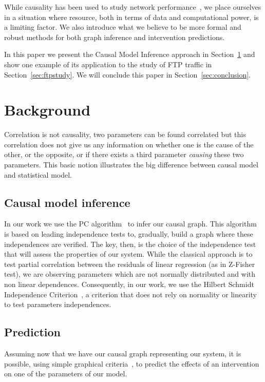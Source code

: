 \documentclass[]{algotel}
\begin{document}
While causality has been used to study network performance~\cite{Tariq:2008:AWD:1402946.1402971}, we place ourselves in a situation where resource, both in terms of data and computational power, is a limiting factor. We also introduce what we believe to be more formal and robust methods for both graph inference and intervention predictions.

In this paper we present the Causal Model Inference approach in Section~\ref{sec:introductioncausality} and show one example of its application to the study of FTP traffic in Section~\ref{sec:ftpstudy}. We will conclude this paper in Section~\ref{sec:conclusion}.

\section{Background}
\label{sec:introductioncausality}

Correlation is not causality, two parameters can be found correlated but this correlation does not give us any information on whether one is the cause of the other, or the opposite, or if there exists a third parameter \emph{causing} these two parameters. This basic notion illustrates the big difference between causal model and statistical model.

\subsection{Causal model inference}

In our work we use the PC algorithm~\cite{citeulike:487589} to infer our causal graph. This algorithm is based on leading independence tests to, gradually, build a graph where these independences are verified. The key, then, is the choice of the independence test that will assess the properties of our system. While the classical approach is to test partial correlation between the residuals of linear regression (as in Z-Fisher test), we are observing parameters which are not normally distributed and with non linear dependences. Consequently, in our work, we use the Hilbert Schmidt Independence Criterion~\cite{DBLP:journals/corr/abs-1202-3775}, a criterion that does not rely on normality or linearity to test parameters independences.


\subsection{Prediction}
\label{subsec:prediction}
Assuming now that we have our causal graph representing our system, it is possible, using simple graphical criteria~\cite{PearlJ2000,citeulike:487589}, to predict the effects of an intervention on one of the parameters of our model. 
\end{document}

